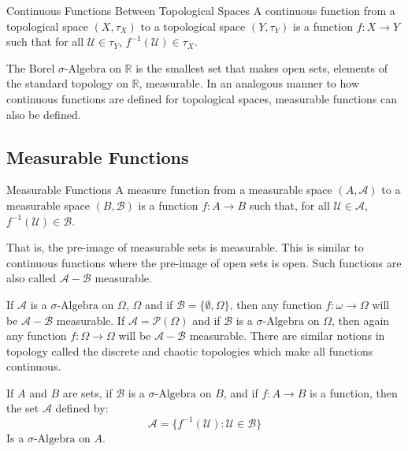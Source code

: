 \documentclass[crop=false,class=book,oneside]{standalone}
\begin{document}
            \begin{ldefinition}
                  {Continuous Functions Between Topological Spaces}
                A continuous function from a topological space
                $(X,\tau_{X})$ to a topological space
                $(Y,\tau_{Y})$ is a function $f:X\rightarrow{Y}$ such that
                for all $\mathcal{U}\in\tau_{Y}$,
                $f^{-1}(\mathcal{U})\in\tau_{X}$.
            \end{ldefinition}
            The Borel $\sigma\text{-Algebra}$ on $\mathbb{R}$ is the
            smallest set that makes open sets, elements of the standard
            topology on $\mathbb{R}$, measurable. In an analogous manner
            to how continuous functions are defined for topological
            spaces, measurable functions can also be defined.
        \subsection{Measurable Functions}
            \begin{ldefinition}{Measurable Functions}
                A measure function from a measurable space
                $(A,\mathcal{A})$ to a measurable space
                $(B,\mathcal{B})$ is a function $f:A\rightarrow{B}$
                such that, for all $\mathcal{U}\in\mathcal{A}$,
                $f^{-1}(\mathcal{U})\in\mathcal{B}$.
            \end{ldefinition}
            That is, the pre-image of measurable sets is measurable.
            This is similar to continuous functions where the pre-image
            of open sets is open. Such functions are also called
            $\mathcal{A}-\mathcal{B}$ measurable.
            \begin{lexample}
                If $\mathcal{A}$ is a $\sigma\text{-Algebra}$ on $\Omega$,
                $\Omega$ and if $\mathcal{B}=\{\emptyset,\Omega\}$,
                then any function $f:\omega\rightarrow\Omega$ will be
                $\mathcal{A}-\mathcal{B}$ measurable. If
                $\mathcal{A}=\mathcal{P}(\Omega)$ and if
                $\mathcal{B}$ is a $\sigma\text{-Algebra}$ on $\Omega$,
                then again any function $f:\Omega\rightarrow\Omega$ will
                be $\mathcal{A}-\mathcal{B}$ measurable. There are similar
                notions in topology called the discrete and chaotic
                topologies which make all functions continuous.
            \end{lexample}
            \begin{theorem}
                If $A$ and $B$ are sets, if $\mathcal{B}$ is a
                $\sigma\text{-Algebra}$ on $B$, and if $f:A\rightarrow{B}$
                is a function, then the set $\mathcal{A}$ defined by:
                \begin{equation}
                    \mathcal{A}=
                    \{f^{-1}(\mathcal{U}):\mathcal{U}\in\mathcal{B}\}
                \end{equation}
                Is a $\sigma\text{-Algebra}$ on $A$.
            \end{theorem}
\end{document}

